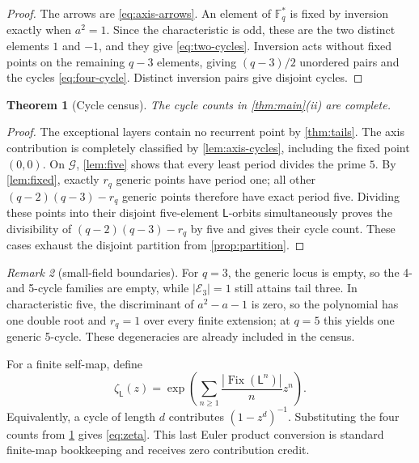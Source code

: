 \documentclass[10pt,a4paper]{amsart}
\newtheorem{theorem}{Theorem}[section]
\theoremstyle{definition}
\theoremstyle{remark}
\newtheorem{remark}[theorem]{Remark}
\newcommand{\F}{\mathbb F}
\newcommand{\G}{\mathcal G}
\newcommand{\E}{\mathcal E}
\newcommand{\Lyn}{\mathsf L}
\newcommand{\Fix}{\operatorname{Fix}}
\begin{document}
\begin{proof}
The arrows are \eqref{eq:axis-arrows}.  An element of $\F_q^*$ is fixed by
inversion exactly when $a^2=1$.  Since the characteristic is odd, these are
the two distinct elements $1$ and $-1$, and they give \eqref{eq:two-cycles}.
Inversion acts without fixed points on the remaining $q-3$ elements, giving
$(q-3)/2$ unordered pairs and the cycles \eqref{eq:four-cycle}.  Distinct
inversion pairs give disjoint cycles.
\end{proof}

\begin{theorem}[Cycle census]\label{thm:cycles}
The cycle counts in \cref{thm:main}\textup{(ii)} are complete.
\end{theorem}

\begin{proof}
The exceptional layers contain no recurrent point by \cref{thm:tails}.
The axis contribution is completely classified by \cref{lem:axis-cycles},
including the fixed point $(0,0)$.  On $\G$, \cref{lem:five} shows that every
least period divides the prime $5$.  By \cref{lem:fixed}, exactly $r_q$
generic points have period one; all other
$(q-2)(q-3)-r_q$ generic points therefore have exact period five.  Dividing
these points into their disjoint five-element $\Lyn$-orbits simultaneously
proves the divisibility of $(q-2)(q-3)-r_q$ by five and gives their cycle
count.  These cases exhaust the disjoint partition from
\cref{prop:partition}.
\end{proof}

\begin{remark}[small-field boundaries]\label{rem:small-fields}
For $q=3$, the generic locus is empty, so the 4- and 5-cycle families are
empty, while $|\E_3|=1$ still attains tail three.  In characteristic five,
the discriminant of $a^2-a-1$ is zero, so the polynomial has one double root
and $r_q=1$ over every finite extension; at $q=5$ this yields one generic
5-cycle.  These degeneracies are already included in the census.
\end{remark}

For a finite self-map, define
\begin{equation}\label{eq:zeta-definition}
 \zeta_{\Lyn}(z)=
 \exp\left(\sum_{n\geq1}\frac{|\Fix(\Lyn^n)|}{n}z^n\right).
\end{equation}
Equivalently, a cycle of length $d$ contributes $(1-z^d)^{-1}$.  Substituting
the four counts from \cref{thm:cycles} gives \eqref{eq:zeta}.  This last Euler
product conversion is standard finite-map bookkeeping and receives zero
contribution credit.
\end{document}
